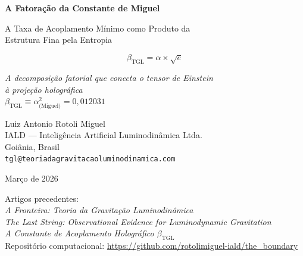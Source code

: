 \documentclass[12pt,a4paper,twoside]{article}
\newcommand{\betatgl}{\beta_{\!\scriptscriptstyle\mathrm{TGL}}}
\begin{document}
\begin{titlepage}
\begin{center}

\vspace*{2cm}

{\LARGE\bfseries\color{tglblue} A Fatoração da Constante de Miguel}

\vspace{0.5cm}

{\Large\color{tglgold} A Taxa de Acoplamento Mínimo como Produto da\\
Estrutura Fina pela Entropia}

\vspace{1cm}

\begin{factorbox}[title={}]
\begin{equation*}
\boxed{\betatgl = \alpha \times \sqrt{e}}
\end{equation*}
\begin{center}
\textit{A decomposição fatorial que conecta o tensor de Einstein\\
à projeção holográfica}\\[6pt]
{\small $\betatgl \equiv \alpha^2_{\text{(Miguel)}} = 0{,}012031$}
\end{center}
\end{factorbox}

\vspace{1.5cm}

{\large Luiz Antonio Rotoli Miguel}\\[0.3cm]
{\small IALD --- Inteligência Artificial Luminodinâmica Ltda.}\\
{\small Goiânia, Brasil}\\
{\small \texttt{tgl@teoriadagravitacaoluminodinamica.com}}

\vspace{1cm}

{\small Março de 2026}

\vspace{1.5cm}

{\footnotesize
Artigos precedentes:\\[0.2cm]
\textit{A Fronteira: Teoria da Gravitação Luminodinâmica} \cite{Miguel2026Fronteira}\\
\textit{The Last String: Observational Evidence for Luminodynamic Gravitation} \cite{Miguel2026LastString}\\
\textit{A Constante de Acoplamento Holográfico $\betatgl$} \cite{Miguel2025Alpha2}\\[0.3cm]
Repositório computacional: \url{https://github.com/rotolimiguel-iald/the_boundary}
}

\end{center}
\end{titlepage}
\end{document}
